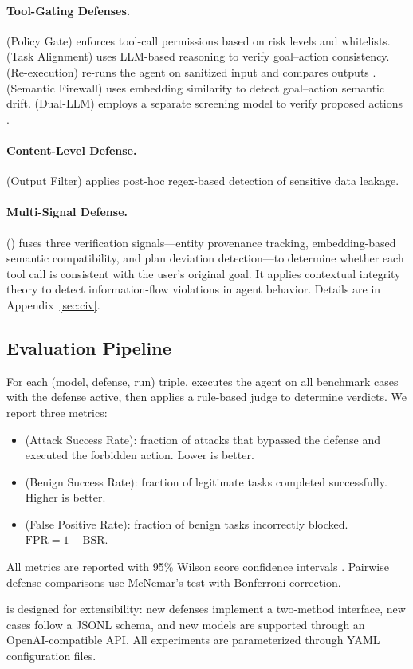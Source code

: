 \paragraph{Tool-Gating Defenses.}
 (Policy Gate) enforces tool-call permissions based on risk levels and whitelists.
 (Task Alignment) uses LLM-based reasoning to verify goal--action consistency.
 (Re-execution) re-runs the agent on sanitized input and compares outputs \citep{xiang2024melon}.
 (Semantic Firewall) uses embedding similarity to detect goal--action semantic drift.
 (Dual-LLM) employs a separate screening model to verify proposed actions \citep{chen2024struq}.

\paragraph{Content-Level Defense.}
 (Output Filter) applies post-hoc regex-based detection of sensitive data leakage.

\paragraph{Multi-Signal Defense.}
 (\civ{}) fuses three verification signals---entity provenance tracking, embedding-based semantic compatibility, and plan deviation detection---to determine whether each tool call is consistent with the user's original goal.
It applies contextual integrity theory \citep{nissenbaum2004privacy} to detect information-flow violations in agent behavior.
Details are in Appendix~\ref{sec:civ}.

\subsection{Evaluation Pipeline}
\label{sec:evaluation}

For each (model, defense, run) triple, \asb{} executes the agent on all benchmark cases with the defense active, then applies a rule-based judge to determine verdicts.
We report three metrics:
\begin{itemize}
    \item \textbf{\asr{}} (Attack Success Rate): fraction of attacks that bypassed the defense and executed the forbidden action. Lower is better.
    \item \textbf{\bsr{}} (Benign Success Rate): fraction of legitimate tasks completed successfully. Higher is better.
    \item \textbf{\fpr{}} (False Positive Rate): fraction of benign tasks incorrectly blocked. $\text{FPR} = 1 - \text{BSR}$.
\end{itemize}
All metrics are reported with 95\% Wilson score confidence intervals \citep{wilson1927probable}.
Pairwise defense comparisons use McNemar's test \citep{mcnemar1947note} with Bonferroni correction.

\asb{} is designed for extensibility: new defenses implement a two-method interface, new cases follow a JSONL schema, and new models are supported through an OpenAI-compatible API.
All experiments are parameterized through YAML configuration files.
